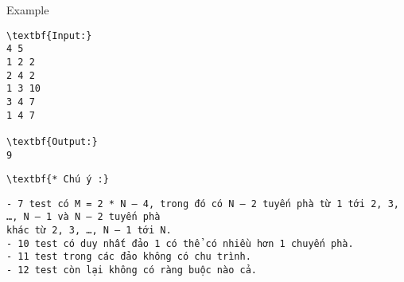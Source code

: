 Example
\begin{verbatim}
\textbf{Input:}
4 5
1 2 2
2 4 2
1 3 10
3 4 7
1 4 7

\textbf{Output:}
9
\end{verbatim}
\begin{verbatim}
\textbf{* Chú ý :}\end{verbatim}
\begin{verbatim}
- 7 test có M = 2 * N – 4, trong đó có N – 2 tuyến phà từ 1 tới 2, 3, …, N – 1 và N – 2 tuyến phà
khác từ 2, 3, …, N – 1 tới N.
- 10 test có duy nhất đảo 1 có thể có nhiều hơn 1 chuyến phà.
- 11 test trong các đảo không có chu trình.
- 12 test còn lại không có ràng buộc nào cả. \end{verbatim}